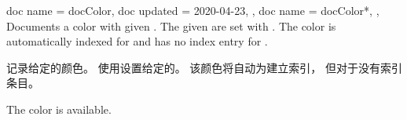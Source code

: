\begin{docCommands}[doc parameter=\oarg{options}\marg{name}]
{
  {
    doc name    = docColor,
    doc updated = 2020-04-23,
  },
  {
    doc name = docColor*,
  },
}
Documents a color with given .
The given  are set with .
The color is automatically indexed for 
and has no index entry for .

记录给定的颜色。 使用设置给定的。 该颜色将自动为建立索引， 但对于没有索引条目。
\begin{dispExample}
The color  is available.
\end{dispExample}
\end{docCommands}
